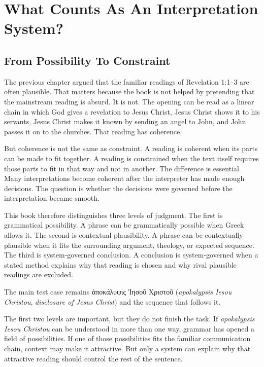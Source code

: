 \chapter{What Counts As An Interpretation System?}

\section{From Possibility To Constraint}

The previous chapter argued that the familiar readings of Revelation 1:1--3 are often plausible. That matters because the book is not helped by pretending that the mainstream reading is absurd. It is not. The opening can be read as a linear chain in which God gives a revelation to Jesus Christ, Jesus Christ shows it to his servants, Jesus Christ makes it known by sending an angel to John, and John passes it on to the churches. That reading has coherence.

But coherence is not the same as constraint. A reading is coherent when its parts can be made to fit together. A reading is constrained when the text itself requires those parts to fit in that way and not in another. The difference is essential. Many interpretations become coherent after the interpreter has made enough decisions. The question is whether the decisions were governed before the interpretation became smooth.

This book therefore distinguishes three levels of judgment. The first is grammatical possibility. A phrase can be grammatically possible when Greek allows it. The second is contextual plausibility. A phrase can be contextually plausible when it fits the surrounding argument, theology, or expected sequence. The third is system-governed conclusion. A conclusion is system-governed when a stated method explains why that reading is chosen and why rival plausible readings are excluded.

The main test case remains \textgreek{ἀποκάλυψις Ἰησοῦ Χριστοῦ} (\textit{apokalypsis Iesou Christou}, \textit{disclosure of Jesus Christ}) and the sequence that follows it.

The first two levels are important, but they do not finish the task. If \textit{apokalypsis Iesou Christou} can be understood in more than one way, grammar has opened a field of possibilities. If one of those possibilities fits the familiar communication chain, context may make it attractive. But only a system can explain why that attractive reading should control the rest of the sentence.

